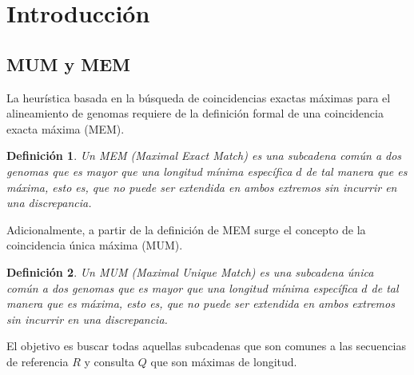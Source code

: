\documentclass[12pt,a4paper]{article}
\newtheorem{mydef}{Definición}
\begin{document}
\section{Introducción} 
\subsection{MUM y MEM} 
\indent
La heurística basada en la búsqueda de coincidencias exactas máximas para el alineamiento de genomas requiere de la definición formal de una coincidencia exacta máxima (MEM).\\
\begin{mydef}
  Un MEM (Maximal Exact Match) es una subcadena común a dos
  genomas que es mayor que una longitud mínima específica $d$ de tal manera
  que es máxima, esto es, que no puede ser extendida en ambos extremos sin
  incurrir en una discrepancia. 
\end{mydef}
\indent
Adicionalmente, a partir de la definición de MEM surge el concepto de la coincidencia única máxima (MUM).\\
\begin{mydef}Un MUM (Maximal Unique Match) es una subcadena única común a dos genomas que es mayor que una longitud mínima específica $d$ de tal manera que es máxima, esto es, que no puede ser extendida en ambos extremos sin incurrir en una discrepancia.
\end{mydef}
\indent
El objetivo es buscar todas aquellas subcadenas que son comunes a las secuencias de referencia $R$ y consulta $Q$ que son máximas de longitud.\\
\end{document}
